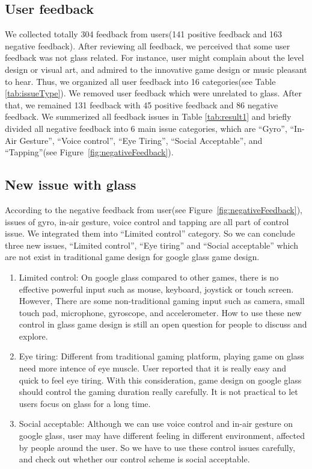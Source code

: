 \subsection{User feedback}
We collected totally 304 feedback from users(141 positive feedback and 163 negative feedback). After reviewing all feedback, we perceived that some user feedback was not glass related. For instance, user might complain about the level design or visual art, and admired to the innovative game design or music pleasant to hear. Thus, we organized all user feedback into 16 categories(see Table \ref{tab:issueType}). We removed user feedback which were unrelated to glass. After that, we remained 131 feedback with 45 positive feedback and 86 negative feedback. 
We summerized all feedback issues in Table \ref{tab:result1} and briefly divided all negative feedback into 6 main issue categories, which are ``Gyro'', ``In-Air Gesture'', ``Voice control'', ``Eye Tiring'', ``Social Acceptable'', and ``Tapping''(see Figure~\ref{fig:negativeFeedback}).


\subsection{New issue with glass}
According to the negative feedback from user(see Figure~\ref{fig:negativeFeedback}), issues of gyro, in-air gesture, voice control and tapping are all part of control issue. We integrated them into ``Limited control'' category. So we can conclude three new issues, ``Limited control'', ``Eye tiring'' and ``Social acceptable'' which are not exist in traditional game design for google glass game design.

\begin{enumerate}
\item Limited control: On google glass compared to other games, there is no effective powerful input such as mouse, keyboard, joystick or touch screen. However, There are some non-traditional gaming input such as camera, small touch pad, microphone, gyroscope, and accelerometer. How to use these new control in glass game design is still an open question for people to discuss and explore.

\item Eye tiring: Different from traditional gaming platform, playing game on glass need more intence of eye muscle. User reported that it is really easy and quick to feel eye tiring. With this consideration, game design on google glass should control the gaming duration really carefully. It is not practical to let users focus on glass for a long time.

\item Social acceptable: Although we can use voice control and in-air gesture on google glass, user may have different feeling in different environment, affected by people around the user. So we have to use these control issues carefully, and check out whether our control scheme is social acceptable.

\end{enumerate}


